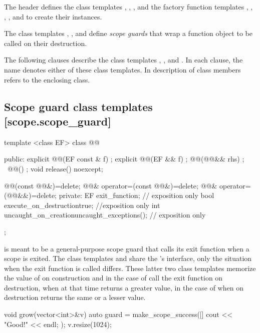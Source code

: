 \documentclass[ebook,11pt,article]{memoir}
\begin{document}
\pnum
The header   defines the class templates , , ,  
and the factory function templates , ,
,
, and   to create their instances.

\pnum 
The class templates , , and  define\emph{ scope guards} that wrap a function object to be called on their destruction.

\pnum
The following clauses describe the class templates , , and . In each clause, the name  denotes either of these class templates. In description of class members  refers to the enclosing class.

\subsection {Scope guard class templates [scope.scope_guard]}

\begin{codeblock}
template <class EF>
class @@ {
public:
  explicit @@(EF const & f) ;
  explicit @@(EF && f) ;
  @@(@@&& rhs) ;
  ~@@() ;
  void release() noexcept;

  @@(const @@&)=delete;
  @@& operator=(const @@&)=delete;
  @@& operator=(@@&&)=delete;
private:
  EF exit_function;    // exposition only
  bool execute_on_destruction{true}; //exposition only
  int  uncaught_on_creation{uncaught_exceptions()}; // exposition only
};

\end{codeblock}
\pnum
\enternote
{} is meant to be a general-purpose scope guard that calls its exit function when a scope is exited. The class templates  and  share the 's interface, only the situation when the exit function is called differs. These latter two class templates memorize the value of  on construction and in the case of  call the exit function on destruction, when  at that time returns a greater value, in the case of  when  on destruction returns the same or a lesser value.\\
\enterexample
\begin{codeblock}
void grow(vector<int>&v){
	auto guard = make_scope_success([]{ cout << "Good!" << endl; });
	v.resize(1024);
}
\end{codeblock}
\exitexample
\exitnote
\end{document}
